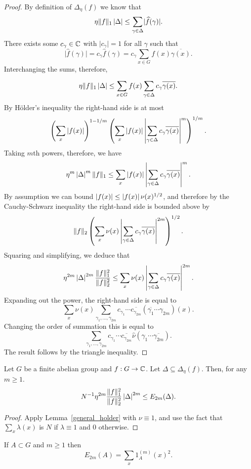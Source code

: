 \begin{proof}
By definition of $\Delta_\eta(f)$ we know that
\[\eta\lVert f\rVert_1\left\lvert \Delta\right\rvert\leq \sum_{\gamma\in\Delta} \lvert \widehat{f}(\gamma)\rvert.\]
There exists some $c_\gamma\in\mathbb{C}$ with $\lvert c_\gamma\rvert=1$ for all $\gamma$ such that
\[\lvert \widehat{f}(\gamma)\rvert=c_\gamma\widehat{f}(\gamma)=c_\gamma \sum_{x\in G}f(x)\overline{\gamma(x)}.\]
Interchanging the sums, therefore,

\[\eta\lVert f\rVert_1\left\lvert \Delta\right\rvert\leq \sum_{x\in G}f(x)\sum_{\gamma\in\Delta} c_\gamma \overline{\gamma(x)}.\]
By H\"{o}lder's inequality the right-hand side is at most
\[\left( \sum_x \left\lvert f(x)\right\rvert\right)^{1-1/m}\left( \sum_x \left\lvert f(x)\right\rvert\left\lvert \sum_{\gamma\in\Delta}c_\gamma\overline{\gamma(x)}\right\rvert^m\right)^{1/m}.\]
Taking $m$th powers, therefore, we have
\[\eta^m\left\lvert \Delta\right\rvert^m\lVert f\rVert_1\leq \sum_{x}\left\lvert f(x)\right\rvert\left\lvert \sum_{\gamma\in\Delta}c_\gamma\overline{\gamma(x)}\right\rvert^m.\]
By assumption we can bound $\left\lvert f(x)\right\rvert\leq \left\lvert f(x)\right\rvert\nu(x)^{1/2}$, and therefore by the Cauchy-Schwarz inequality the right-hand side is bounded above by
\[\lVert f\rVert_2\left( \sum_x \nu(x)\left\lvert \sum_{\gamma\in\Delta}c_\gamma\overline{\gamma(x)}\right\rvert^{2m}\right)^{1/2}.\]
Squaring and simplifying, we deduce that
\[\eta^{2m}\left\lvert \Delta\right\rvert^{2m}\frac{\lVert f\rVert_1^2}{\lVert f\rVert_2^2}\leq \sum_x \nu(x)\left\lvert \sum_{\gamma\in\Delta}c_\gamma\overline{\gamma(x)}\right\rvert^{2m}.\]
Expanding out the power, the right-hand side is equal to
\[\sum_x \nu(x)\sum_{\gamma_1,\ldots,\gamma_{2m}}c_{\gamma_1}\cdots \overline{c_{\gamma_{2m}}} (\overline{\gamma_1}\cdots \gamma_{2m})(x).\]
Changing the order of summation this is equal to
\[\sum_{\gamma_1,\ldots,\gamma_{2m}}c_{\gamma_1}\cdots \overline{c_{\gamma_{2m}}}
\widehat{\nu}(\gamma_1\cdots \overline{\gamma_{2m}}).\]
The result follows by the triangle inequality.
\end{proof}


\begin{lemma}
\label{spec_holder}
Let $G$ be a finite abelian group and $f:G\to\mathbb{C}$. Let $\Delta\subseteq \Delta_\eta(f)$. Then, for any $m\geq 1$.
\[N^{-1}\eta^{2m}\frac{\lVert f\rVert_1^2}{\lVert f\rVert_2^2}\left\lvert \Delta\right\rvert^{2m}\leq E_{2m}(\Delta).\]
\end{lemma}

\begin{proof}
Apply Lemma~\ref{general_holder} with $\nu\equiv 1$, and use the fact that $\sum_x \lambda(x)$ is $N$ if $\lambda\equiv 1$ and $0$ otherwise.
\end{proof}


\begin{lemma}
\label{energy_alt}
If $A\subset G$ and $m\geq 1$ then
\[E_{2m}(A) = \sum_x 1_A^{(m)}(x)^2.\]
\end{lemma}

